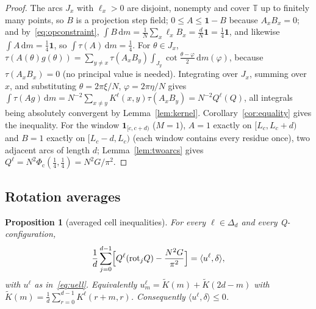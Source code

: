\documentclass[11pt]{amsart}
\newtheorem{proposition}[theorem]{Proposition}
\theoremstyle{definition}
\theoremstyle{remark}
\numberwithin{equation}{section}
\newcommand{\T}{\mathbb{T}}
\newcommand{\one}{\mathbf{1}}
\newcommand{\ip}[2]{\langle #1,#2\rangle}
\newcommand{\Phic}{\Phi_{\mathrm c}}
\newcommand{\dd}{\,\mathrm{d}}
\begin{document}
\begin{proof}
The arcs $J_x$ with $\ell_x>0$ are disjoint, nonempty and cover $\T$ up to finitely many points, so $B$ is a projection
step field; $0\le A\le\one-B$ because $A_xB_x=0$; and by~\eqref{eq:opconstraint},
$\int B\dd m=\frac1N\sum_x\ell_xB_x=\frac dN\one=\frac14\one$, and likewise $\int A\dd m=\frac14\one$, so
$\int\tau(A)\dd m=\frac14$. For $\theta\in J_x$, $\tau(A(\theta)g(\theta))=\sum_{y\ne x}\tau(A_xB_y)\int_{J_y}\cot\frac{\theta-\varphi}2\dd m(\varphi)$,
because $\tau(A_xB_x)=0$ (no principal value is needed). Integrating over $J_x$, summing over $x$, and substituting
$\theta=2\pi\xi/N$, $\varphi=2\pi\eta/N$ gives $\int\tau(Ag)\dd m=N^{-2}\sum_{x\ne y}K^\ell(x,y)\tau(A_xB_y)=N^{-2}Q^\ell(Q)$, all
integrals being absolutely convergent by Lemma~\ref{lem:kernel}. Corollary~\ref{cor:equality} gives the inequality. For
the window $\one_{[c,c+d)}$ ($M=1$), $A=1$ exactly on $[L_c,L_c+d)$ and $B=1$ exactly on $[L_c-d,L_c)$ (each window contains
every residue once), two adjacent arcs of length $d$; Lemma~\ref{lem:twoarcs} gives $Q^\ell=N^2\Phic(\frac14,\frac14)=N^2G/\pi^2$.
\end{proof}

\subsection{Rotation averages}
\begin{proposition}[averaged cell inequalities]\label{prop:average}
For every $\ell\in\Delta_d$ and every Q-configuration,
\begin{equation}\label{eq:average}
\frac1d\sum_{j=0}^{d-1}\Bigl[Q^\ell(\mathrm{rot}_jQ)-\frac{N^2G}{\pi^2}\Bigr]=\ip{u^\ell}\delta ,
\end{equation}
with $u^\ell$ as in~\eqref{eq:uell}. Equivalently $u^\ell_m=\tilde K(m)+\tilde K(2d-m)$ with
$\tilde K(m)=\frac1d\sum_{r=0}^{d-1}K^\ell(r+m,r)$. Consequently $\ip{u^\ell}\delta\le0$.
\end{proposition}
\end{document}
